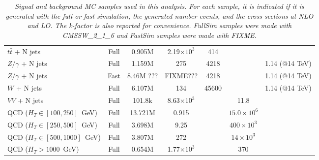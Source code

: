 \begin{table}[htb]
\begin{center}
\begin{tabular}{|l|cccccc|}
      $t\bar{t}$ + N jets         & Full      & 0.905M    &    2.19$\times 10^3$   & 414                 &                    & \\
      $Z/\gamma$ + N jets         & Full      & 1.159M    &     275	              & 4218                &                 & 1.14 (@14 TeV)\\
      $Z/\gamma$ + N jets         & Fast      & 8.46M ??? &     FIXME???	      & 4218                &                 & 1.14 (@14 TeV)\\
      $W$ + N jets                & Full      & 6.107M    &     134	              & 45600               &                 & 1.14 (@14 TeV)\\
      $VV$ + N jets               & Full      & 101.8k    &    8.63$\times 10^3$   &                     & 11.8               & \\ \hline
      QCD ($H_T\in[100,250]$~GeV) & Full      & 13.721M   &    0.915	              &                     & $15.0 \times 10^6$ & \\
      QCD ($H_T\in[250,500]$~GeV) & Full      & 3.698M    &       9.25	      &                     & $400 \times 10^3$  & \\
      QCD ($H_T\in[500,1000]$~GeV)& Full      & 3.807M    &     272	              &                     &  $14 \times 10^3$  & \\
      QCD ($H_T>1000$~GeV)        & Full      & 0.654M    &    1.77$\times 10^3$   &                     & $370$              & \\
       \hline\hline
    \end{tabular}
    \caption{\small \sl Signal and background MC samples used in this analysis. For each sample, it is indicated 
      if it is generated with the full or fast simulation, the generated number events, and the cross sections at NLO and LO. 
      The k-factor is also reported for convenience.
      FullSim samples were made with CMSSW\_2\_1\_6 and FastSim samples were made with FIXME.}
  \end{center}
\end{table}

 


